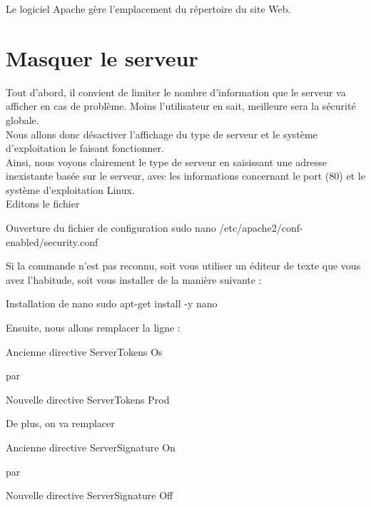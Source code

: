 {Le logiciel Apache gère l’emplacement du répertoire du site Web. \\


\section{Masquer le serveur}

Tout d’abord, il convient de limiter le nombre d’information que le serveur va afficher en cas de problème. Moins l’utilisateur en sait, meilleure sera la sécurité globale.\\

Nous allons donc désactiver l’affichage du type de serveur et le système d’exploitation le faisant fonctionner.\\

Ainsi, nous voyons clairement le type de serveur en saisissant une adresse inexistante basée sur le serveur, avec les informations concernant le port (80) et le système d’exploitation Linux. \\

Editons le fichier 

\begin{Bash}{Ouverture du fichier de configuration}
sudo nano /etc/apache2/conf-enabled/security.conf 
\end{Bash}

Si la commande  n'est pas reconnu, soit vous utiliser un éditeur de texte que vous avez l'habitude, soit vous installer  de la manière suivante : 

\begin{Bash}{Installation de nano}
sudo apt-get install -y nano
\end{Bash}


Ensuite, nous allons remplacer la ligne :
\begin{Bash}{Ancienne directive}
ServerTokens Os 
\end{Bash}
par
\begin{Bash}{Nouvelle directive}
ServerTokens Prod 
\end{Bash}

De plus, on va remplacer 

\begin{Bash}{Ancienne directive}
ServerSignature On
\end{Bash}
par
\begin{Bash}{Nouvelle directive}
ServerSignature Off
\end{Bash}



}

